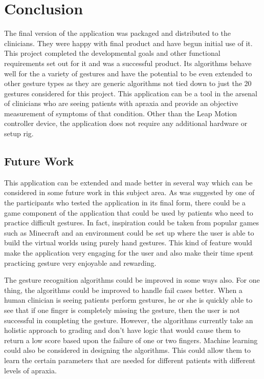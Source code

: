 \chapter{Conclusion}

\label{Chapter9_conclusion} 

\begin{comment}
-------------------------------------------------
9. Conclusion
	a. Future Work
		i. Scoring Functions Improvement
		ii. Other Improvements (UI, distribution, change of framework. electron ui -> web based. )
	b. Personal Note
-------------------------------------------------
\end{comment}
The final version of the application was packaged and distributed to the clinicians. They were happy with final product and have begun initial use of it. This project completed the developmental goals and other functional requirements set out for it and was a successful product. Its algorithms behave well for the a variety of gestures and have the potential to be even extended to other gesture types as they are generic algorithms not tied down to just the 20 gestures considered for this project. This application can be a tool in the arsenal of clinicians who are seeing patients with apraxia and provide an objective measurement of symptoms of that condition. Other than the Leap Motion controller device, the application does not require any additional hardware or setup rig. 


\section{Future Work}
This application can be extended and made better in several way which can be considered in some future work in this subject area. As was suggested by one of the participants who tested the application in its final form, there could be a game component of the application that could be used by patients who need to practice difficult gestures. In fact, inspiration could be taken from popular games such as Minecraft and an environment could be set up where the user is able to build the virtual worlds using purely hand gestures. This kind of feature would make the application very engaging for the user and also make their time spent practicing gesture very enjoyable and rewarding. 

The gesture recognition algorithms could be improved in some ways also. For one thing, the algorithms could be improved to handle fail cases better. When a human clinician is seeing patients perform gestures, he or she is quickly able to see that if one finger is completely missing the gesture, then the user is not successful in completing the gesture. However, the algorithms currently take an holistic approach to grading and don't have logic that would cause them to return a low score based upon the failure of one or two fingers. Machine learning could also be considered in designing the algorithms. This could allow them to learn the certain parameters that are needed for different patients with different levels of apraxia. 


